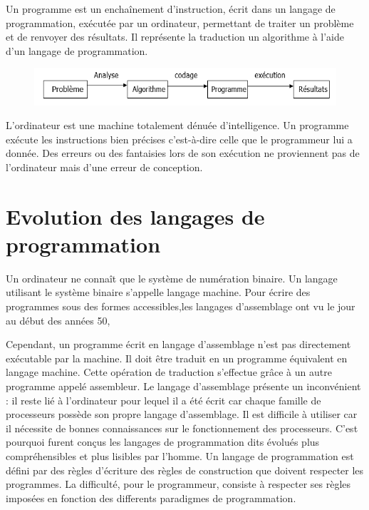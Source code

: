 \documentclass[a4paper,12pt]{article} %
\begin{document}
Un programme est un enchaînement d'instruction, écrit dans un langage de programmation, exécutée par un ordinateur, permettant de traiter un problème et de renvoyer des résultats. Il représente la traduction un algorithme à l'aide d'un langage de programmation.
\begin{figure}[h] %
  \centering %
  \includegraphics[scale=1]{img1.PNG} %
\end{figure}
L'ordinateur est une machine totalement dénuée d'intelligence. Un programme exécute les instructions bien précises c'est-à-dire celle que le programmeur lui a donnée. Des erreurs ou des fantaisies lors de son exécution ne proviennent pas de l'ordinateur mais d'une erreur de conception.

\section{Evolution des langages de programmation} %

Un ordinateur ne connaît que le système de numération binaire. Un langage utilisant le système binaire s'appelle langage machine.
Pour écrire des programmes sous des formes accessibles,les langages d'assemblage ont vu le jour au début des années 50, 
 
Cependant, un programme écrit en langage d'assemblage n'est pas directement exécutable par la machine. Il doit être traduit en un programme équivalent en langage machine. Cette opération de traduction s'effectue grâce à un autre programme appelé assembleur.
Le langage d'assemblage présente un inconvénient : il reste lié à l'ordinateur pour lequel il a été écrit car chaque famille de processeurs possède son propre langage d'assemblage. Il est difficile à utiliser car il nécessite de bonnes connaissances sur le fonctionnement des processeurs.
C'est pourquoi furent conçus les langages de programmation dits évolués plus compréhensibles et plus lisibles par l'homme.
Un langage de programmation est défini par des règles d'écriture des règles de construction que doivent respecter les programmes. La difficulté, pour le programmeur, consiste à respecter ses règles imposées en fonction des differents paradigmes de programmation.
\end{document}
